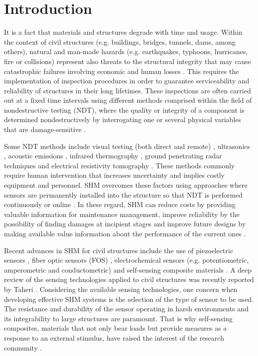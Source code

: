 \documentclass[twocolumn]{bmcart}%
\begin{document}
\section{Introduction} \label{introduction}
It is a fact that materials and structures degrade with time and usage. Within the context of civil structures (e.g. buildings, bridges, tunnels, dams, among others), natural and man-made hazards (e.g. earthquakes, typhoons, hurricanes, fire or collisions) represent also threats to the structural integrity that may cause catastrophic failures involving economic and human losses \cite{Xu2017a}. This requires the implementation of inspection procedures in order to guarantee serviceability and reliability of structures in their long lifetimes. These inspections are often carried out at a fixed time intervals using different methods comprised within the field of nondestructive testing (NDT), where the quality or integrity of a component is determined nondestructively by interrogating one or several physical variables that are damage-sensitive \cite{Shull2002}.

Some NDT methods include visual testing (both direct and remote) \cite{Agnisarman2019}, ultrasonics \cite{Zhao2018}, acoustic emissions \cite{Meo2014}, infrared thermography \cite{Yamazaki2018}, ground penetrating radar techniques and electrical resistivity tomography \cite{Salin2018}. These methods commonly require human intervention that increases uncertainty and implies costly equipment and personnel. SHM overcomes these factors using approaches where sensors are permanently installed into the structure so that NDT is performed continuously or online \cite{Xu2017a}. In these regard, SHM can reduce costs by providing valuable information for maintenance management, improve reliability by the possibility of finding damages at incipient stages and improve future designs by making available value information about the performance of the current ones \cite{Ogai2018a}.

Recent advances in SHM for civil structures include the use of piezoelectric sensors \cite{Liao2019},  fiber optic sensors (FOS) \cite{Glisic2013, Barrias2019, Xu2019}, electrochemical sensors (e.g. potentiometric, amperometric and conductometric) \cite{Hu2011, Qiao2012} and self-sensing composite materials \cite{Tian2019a}. A deep review of the sensing technologies applied to civil structures was recently reported by Taheri \cite{Taheri2019a}. Considering the available sensing technologies, one concern when developing effective SHM systems is the selection of the type of sensor to be used. The resistance and durability of the sensor operating in harsh environments and its integrability to large structures are paramount. That is why self-sensing composites, materials that not only bear loads but provide measures as a response to an external stimulus, have raised the interest of the research community \cite{DAlessandro2016, Han2015a, Rana2016a, Yang2020a}.
\end{document}

